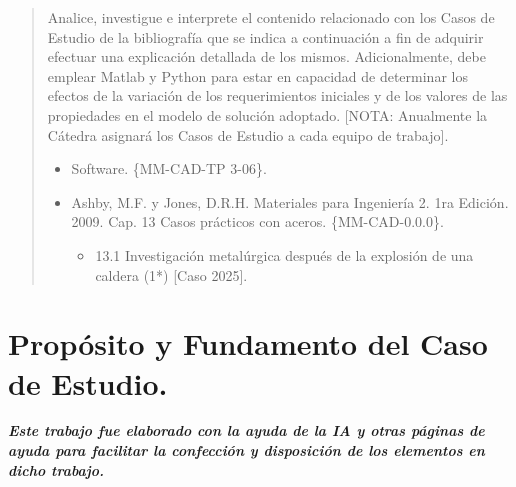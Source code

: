 \documentclass[12pt,a4paper]{article}
\begin{document}

\newpage
\tableofcontents

\begin{abstract}
    Analice, investigue e interprete el contenido relacionado con los Casos de Estudio de la bibliografía que se indica a continuación a fin de adquirir efectuar una explicación detallada de los mismos. Adicionalmente, debe emplear Matlab y Python para estar en capacidad de determinar los efectos de la variación de los requerimientos iniciales y de los valores de las propiedades en el modelo de solución adoptado. [NOTA: Anualmente la Cátedra asignará los Casos de Estudio a cada equipo de trabajo].
    \begin{itemize}
        \item Software. \{MM-CAD-TP 3-06\}.
        \item Ashby, M.F. y Jones, D.R.H. Materiales para Ingeniería 2. 1ra Edición. 2009. Cap. 13 Casos prácticos con aceros. \{MM-CAD-0.0.0\}.
        \begin{itemize}
            \item 13.1 Investigación metalúrgica después de la explosión de una caldera (1*) [Caso 2025].
        \end{itemize}
    \end{itemize}
\end{abstract}

\section{Propósito y Fundamento del Caso de Estudio.}


\vfill
\textit{\textbf{Este trabajo fue elaborado con la ayuda de la IA y otras páginas de ayuda para facilitar la confección y disposición de los elementos en dicho trabajo.}}
\end{document}
